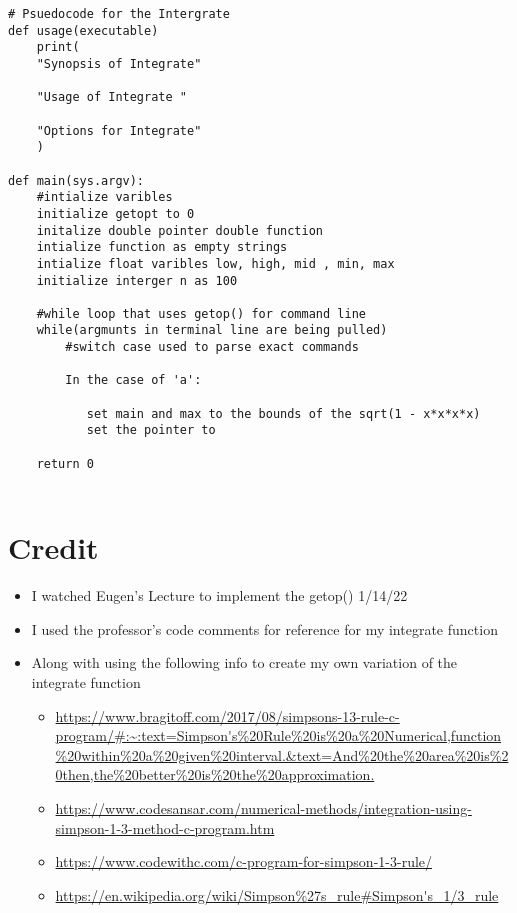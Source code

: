 \documentclass[11pt]{article} %
\begin{document}
\begin{flushleft}
\begin{lstlisting}
# Psuedocode for the Intergrate 
def usage(executable)
    print(
    "Synopsis of Integrate"
    
    "Usage of Integrate "

    "Options for Integrate"
    )

def main(sys.argv):
    #intialize varibles
    initialize getopt to 0
    initalize double pointer double function
    intialize function as empty strings
    intialize float varibles low, high, mid , min, max
    initialize interger n as 100 
    
    #while loop that uses getop() for command line
    while(argmunts in terminal line are being pulled)
        #switch case used to parse exact commands 
        
        In the case of 'a':
            
           set main and max to the bounds of the sqrt(1 - x*x*x*x)
           set the pointer to 
      
    return 0 


\end{lstlisting}

\end{flushleft}
\section*{Credit}

\begin{itemize}
    \item I watched Eugen’s Lecture to implement the getop() 1/14/22
    \item I used the professor's code comments for reference for my integrate function 
    \item Along with using the following info to create my own variation of the integrate function
    \begin{itemize}
        \item \url{https://www.bragitoff.com/2017/08/simpsons-13-rule-c-program/#:~:text=Simpson's%20Rule%20is%20a%20Numerical,function%20within%20a%20given%20interval.&text=And%20the%20area%20is%20then,the%20better%20is%20the%20approximation.} 
        \item \url{https://www.codesansar.com/numerical-methods/integration-using-simpson-1-3-method-c-program.htm}
        \item \url{https://www.codewithc.com/c-program-for-simpson-1-3-rule/}
        \item \url{https://en.wikipedia.org/wiki/Simpson%27s_rule#Simpson's_1/3_rule}
    \end{itemize}
\end{itemize}
\end{document}
